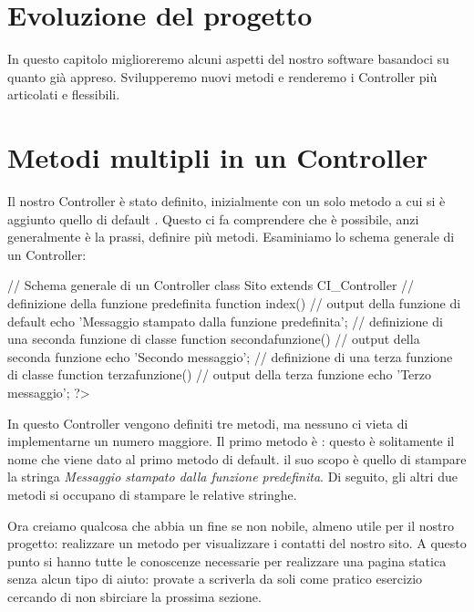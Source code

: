 \section{Evoluzione del progetto}
\label{cap:evoluzione}

In questo capitolo miglioreremo alcuni aspetti del nostro software basandoci su quanto già appreso. Svilupperemo nuovi metodi e renderemo i Controller più articolati e flessibili.

\section*{Metodi multipli in un Controller}
Il nostro Controller  è stato definito, inizialmente con un solo metodo  a cui si è aggiunto quello di default . Questo ci fa comprendere che è possibile, anzi generalmente è la prassi, definire più metodi. Esaminiamo lo schema generale di un Controller:

\begin{code}
// Schema generale di un Controller
class Sito extends CI_Controller {
  // definizione della funzione predefinita
  function index() {
    // output della funzione di default 
    echo 'Messaggio stampato dalla funzione predefinita';
  }
  // definizione di una seconda funzione di classe
  function secondafunzione() {
    // output della seconda funzione 
    echo 'Secondo messaggio';
  }
  // definizione di una terza funzione di classe
  function terzafunzione() {
    // output della terza funzione 
    echo 'Terzo messaggio';
  }
}
?>
\end{code}

In questo Controller  vengono definiti tre metodi, ma nessuno ci vieta di implementarne un numero maggiore. Il primo metodo è : questo è solitamente il nome che viene dato al primo metodo di default. il suo scopo è quello di stampare la stringa \emph{Messaggio stampato dalla funzione predefinita}. Di seguito, gli altri due metodi si occupano di stampare le relative stringhe.

Ora creiamo qualcosa che abbia un fine se non nobile, almeno utile per il nostro progetto: realizzare un metodo per visualizzare i contatti del nostro sito. A questo punto si hanno tutte le conoscenze necessarie per realizzare una pagina statica senza alcun tipo di aiuto: provate a scriverla da soli come pratico esercizio cercando di non sbirciare la prossima sezione.

